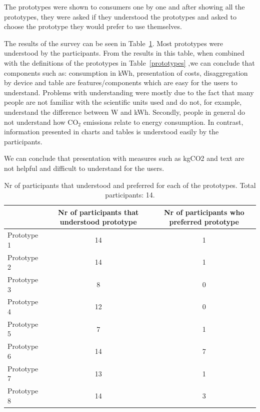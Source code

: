 \documentclass[journal]{vgtc}                %
\begin{document}
The prototypes were shown to consumers one by one and after showing all the prototypes, they were asked if they understood the prototypes and asked to choose the prototype they would prefer to use themselves.

The results of the survey can be seen in Table~\ref{prototypesresults}. Most prototypes were understood by the participants. From the results in this table, when combined with the definitions of the prototypes in Table~\ref{prototypes} ,we can conclude that components such as: consumption in kWh, presentation of costs, disaggregation by device and table are features/components which are easy for the users to understand. Problems with understanding were mostly due to the fact that many people are not familiar with the scientific units used and do not, for example, understand the difference between W and kWh. Secondly, people in general do not understand how CO$_2$ emissions relate to energy consumption.
In contrast, information presented in charts and tables is understood easily by the participants.

We can conclude that presentation with measures such as kgCO2 and text are not helpful and difficult to understand for the users.


\begin{table}
  \caption{Nr of participants that understood and preferred for each of the prototypes. Total participants: 14. \cite{karjalainen2011consumer}}
  \label{prototypesresults}
  \scriptsize
  \begin{center}
    \begin{tabular}{|lcc|}
    \hline
       & \multicolumn{1}{p{2.5cm}}{\centering Nr of participants that understood prototype} & 
       \multicolumn{1}{p{3cm}|}{\centering Nr of participants who preferred prototype}  \\ \hline
       Prototype 1 & 14 & 1 \\ 
       Prototype 2 & 14 & 1 \\ 
       Prototype 3 & 8 & 0 \\ 
       Prototype 4 & 12 & 0 \\ 
       Prototype 5 & 7 & 1 \\ 
       Prototype 6 & 14 & 7 \\ 
       Prototype 7 & 13 & 1 \\ 
       Prototype 8 & 14 & 3 \\ \hline
    \end{tabular}
  \end{center}
\end{table}
\end{document}
